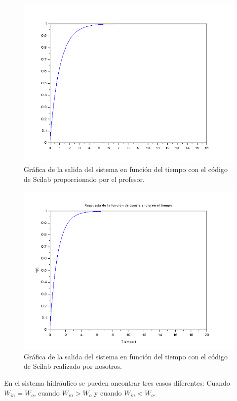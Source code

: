\documentclass[letterpaper]{article}
\begin{document}
	\begin{figure}[h]
		\centering
		\includegraphics[scale=.7]{gra}
		\caption{Gráfica de la salida del sistema en función del tiempo con el código de Scilab proporcionado por el profesor.}
	\end{figure}
	\begin{figure}[h]
		\centering
		\includegraphics[scale=.7]{gra2}
		\caption{Gráfica de la salida del sistema en función del tiempo con el código de Scilab realizado por nosotros.}
	\end{figure}
	\FloatBarrier
	En el sistema hidráulico se pueden ancontrar tres casos diferentes: Cuando $ W_{in}=W_o $, cuando $ W_{in}>W_o $ y cuando $ W_{in}<W_o $.\\\\
\end{document}
